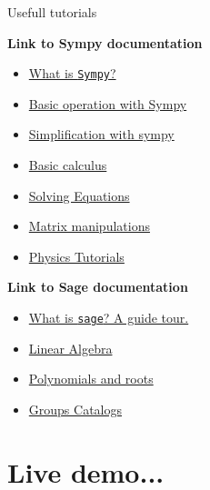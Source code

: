 \documentclass[10pt]{beamer}
\begin{document}
\begin{frame}{Usefull tutorials}
\begin{block}{\textbf{Link to Sympy documentation}}
	\begin{itemize}
		\item \href{https://docs.sympy.org/dev/explanation/gotchas.html}{What is \texttt{Sympy}?}
		\item \href{https://docs.sympy.org/dev/tutorials/intro-tutorial/basic_operations.html}{Basic operation with Sympy}
		\item \href{https://docs.sympy.org/dev/tutorials/intro-tutorial/simplification.html}{Simplification with sympy}
		\item \href{https://docs.sympy.org/dev/tutorials/intro-tutorial/calculus.html}{Basic calculus}
		\item \href{https://docs.sympy.org/dev/tutorials/intro-tutorial/solvers.html}{Solving Equations}
		\item \href{https://docs.sympy.org/dev/tutorials/intro-tutorial/matrices.html}{Matrix manipulations}		
		\item  \href{https://docs.sympy.org/dev/tutorials/physics/index.html}{Physics Tutorials}
	\end{itemize}
\end{block}

\begin{block}{\textbf{Link to Sage documentation}}
\begin{itemize}
	\item \href{https://doc.sagemath.org/html/en/tutorial/tour.html}{What is \texttt{sage}? A guide tour.}
	\item \href{https://doc.sagemath.org/html/en/tutorial/tour_linalg.html}{Linear Algebra}
	\item \href{https://doc.sagemath.org/html/en/tutorial/tour_polynomial.html}{Polynomials and roots}
	\item \href{https://doc.sagemath.org/html/en/reference/groups/sage/groups/groups_catalog.html}{Groups Catalogs}
\end{itemize}
\end{block}
\end{frame}


\section{\textbf{Live demo...}}
\end{document}

